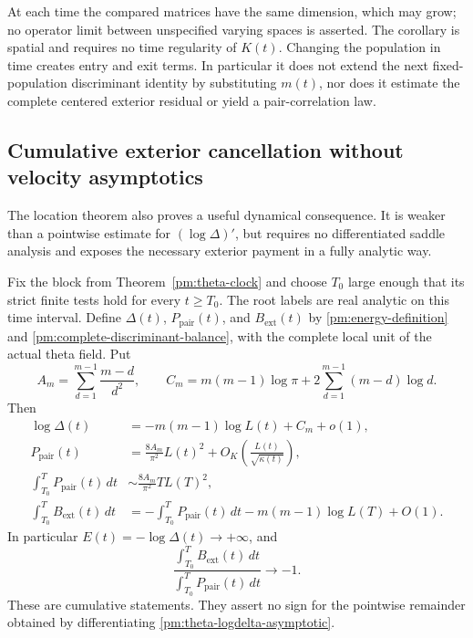 At each time the compared matrices have the same dimension, which may
grow; no operator limit between unspecified varying spaces is asserted.
The corollary is spatial and requires no time regularity of $K(t)$.
Changing the population in time creates entry and exit terms. In
particular it does not extend the next fixed-population discriminant
identity by substituting $m(t)$, nor does it estimate the complete
centered exterior residual or yield a pair-correlation law.

\subsection{Cumulative exterior cancellation without velocity asymptotics}
\label{pm:theta-cancellation-subsection}

The location theorem also proves a useful dynamical consequence.  It is
weaker than a pointwise estimate for \((\log\Delta)'\), but requires
no differentiated saddle analysis and exposes the necessary exterior
payment in a fully analytic way.

\begin{corollary}
\label{pm:theta-cumulative-cancellation}
Fix the block from Theorem~\ref{pm:theta-clock} and choose \(T_0\)
large enough that its strict finite tests hold for every \(t\ge T_0\).
The root labels are real analytic on this time interval.  Define
\(\Delta(t)\), \(P_{\mathrm{pair}}(t)\), and
\(B_{\mathrm{ext}}(t)\) by
\eqref{pm:energy-definition} and
\eqref{pm:complete-discriminant-balance}, with the complete local
unit of the actual theta field.  Put
\begin{equation}
 A_m=\sum_{d=1}^{m-1}\frac{m-d}{d^2},\qquad
 C_m=m(m-1)\log\pi
       +2\sum_{d=1}^{m-1}(m-d)\log d.
 \label{pm:theta-pair-constants}
\end{equation}
Then
\begin{align}
 \log\Delta(t)&=-m(m-1)\log L(t)+C_m+o(1),
 \label{pm:theta-logdelta-asymptotic}\\
 P_{\mathrm{pair}}(t)&=\frac{8A_m}{\pi^2}L(t)^2
                         +O_K\!\left(\frac{L(t)}{\sqrt{\kappa(t)}}\right),
 \label{pm:theta-pair-asymptotic}\\
 \int_{T_0}^T P_{\mathrm{pair}}(t)\,dt
       &\sim\frac{8A_m}{\pi^2}T L(T)^2,
 \label{pm:theta-integrated-pair}\\
 \int_{T_0}^T B_{\mathrm{ext}}(t)\,dt
       &=-\int_{T_0}^T P_{\mathrm{pair}}(t)\,dt
             -m(m-1)\log L(T)+O(1).
 \label{pm:theta-integrated-exterior}
\end{align}
In particular \(E(t)=-\log\Delta(t)\to+\infty\), and
\begin{equation}
 \frac{\displaystyle\int_{T_0}^T B_{\mathrm{ext}}(t)\,dt}
      {\displaystyle\int_{T_0}^T P_{\mathrm{pair}}(t)\,dt}
                  \longrightarrow-1.
 \label{pm:theta-cancellation-ratio}
\end{equation}
These are cumulative statements.  They assert no sign for the pointwise
remainder obtained by differentiating
\eqref{pm:theta-logdelta-asymptotic}.
\end{corollary}

